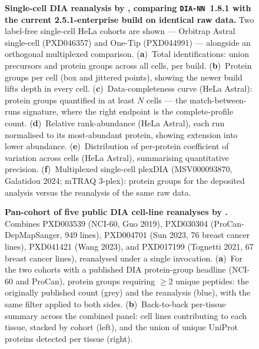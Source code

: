 \begin{figure}[htbp]
  \centering
  \caption[Single-cell DIA reanalysis]{%
    \textbf{Single-cell DIA reanalysis by \quantmsdiann{}, comparing
    \texttt{DIA-NN}~1.8.1 with the current 2.5.1-enterprise build on identical
    raw data.} Two label-free single-cell HeLa cohorts are shown --- Orbitrap
    Astral single-cell (PXD046357) and One-Tip (PXD044991) --- alongside an
    orthogonal multiplexed comparison.
    (\textbf{a})~Total identifications: union precursors and protein groups
    across all cells, per build.
    (\textbf{b})~Protein groups per cell (box and jittered points), showing the
    newer build lifts depth in every cell.
    (\textbf{c})~Data-completeness curve (HeLa Astral): protein groups
    quantified in at least $N$ cells --- the match-between-runs signature, where
    the right endpoint is the complete-profile count.
    (\textbf{d})~Relative rank-abundance (HeLa Astral), each run normalised to
    its most-abundant protein, showing extension into lower abundance.
    (\textbf{e})~Distribution of per-protein coefficient of variation across
    cells (HeLa Astral), summarising quantitative precision.
    (\textbf{f})~Multiplexed single-cell plexDIA (MSV000093870, Galatidou 2024;
    mTRAQ 3-plex): protein groups for the deposited analysis versus the
    \quantmsdiann{} reanalysis of the same raw data.
  }
  \label{fig:single-cell}
\end{figure}

\begin{figure}[htbp]
  \centering
  \caption[Pan-cohort of DIA reanalyses]{%
    \textbf{Pan-cohort of five public DIA cell-line reanalyses by
    \quantmsdiann{}.}
    Combines PXD003539 (NCI-60, Guo 2019), PXD030304
    (ProCan-DepMapSanger, 949 lines), PXD004701 (Sun 2023, 76 breast
    cancer lines), PXD041421 (Wang 2023), and PXD017199 (Tognetti
    2021, 67 breast cancer lines), reanalysed under a single
    \quantmsdiann{} invocation.
    (\textbf{a})~For the two cohorts with a published DIA protein-group
    headline (NCI-60 and ProCan), protein groups requiring $\geq 2$ unique
    peptides: the originally published count (grey) and the \quantmsdiann{}
    reanalysis (blue), with the same filter applied to both sides.
    (\textbf{b})~Back-to-back per-tissue summary across the combined panel:
    cell lines contributing to each tissue, stacked by cohort (left), and the
    union of unique UniProt proteins detected per tissue (right).
  }
  \label{fig:pancohort}
\end{figure}
